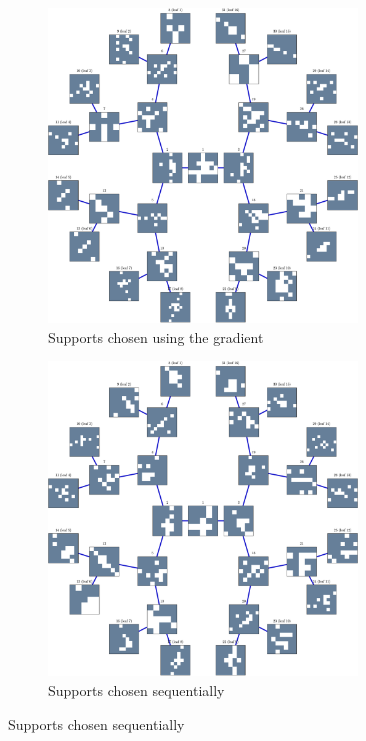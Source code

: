 \begin{figure}[!h] \centering
\begin{subfigure}[b]{0.49\textwidth}\centering
\includegraphics[width=0.9\textwidth]{figures/tree-learn/gradient-vs-sequential/xp_learnsupp256_curvelet_decomp3_tree-binary_dpth4_supp-diracs_usegrad1_every5_add5_totinit0_totadd279_alpha30_tree.pdf}
	\caption{Supports chosen using the gradient}\label{fig_cmp_grad_tree}
\end{subfigure}
\begin{subfigure}[b]{0.49\textwidth}\centering
\includegraphics[width=0.9\textwidth]{figures/tree-learn/gradient-vs-sequential/xp_learnsupp256_curvelet_decomp3_tree-binary_dpth4_supp-diracs_usegrad0_every5_add5_totinit0_totadd279_alpha30_tree.pdf} 
	\caption{Supports chosen sequentially}\label{fig_cmp_seq_tree}
\end{subfigure}
\end{figure}
